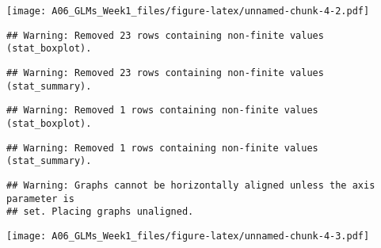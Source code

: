 \documentclass[]{article}
\newenvironment{Shaded}{\begin{snugshade}}{\end{snugshade}}
\newcommand{\CommentTok}[1]{\textcolor[rgb]{0.56,0.35,0.01}{\textit{#1}}}
\newcommand{\DataTypeTok}[1]{\textcolor[rgb]{0.13,0.29,0.53}{#1}}
\newcommand{\DecValTok}[1]{\textcolor[rgb]{0.00,0.00,0.81}{#1}}
\newcommand{\FloatTok}[1]{\textcolor[rgb]{0.00,0.00,0.81}{#1}}
\newcommand{\KeywordTok}[1]{\textcolor[rgb]{0.13,0.29,0.53}{\textbf{#1}}}
\newcommand{\NormalTok}[1]{#1}
\newcommand{\StringTok}[1]{\textcolor[rgb]{0.31,0.60,0.02}{#1}}
\begin{document}
\texttt{[image: A06\_GLMs\_Week1\_files/figure-latex/unnamed-chunk-4-2.pdf]}

\begin{Shaded}
\end{Shaded}

\begin{verbatim}
## Warning: Removed 23 rows containing non-finite values (stat_boxplot).
\end{verbatim}

\begin{verbatim}
## Warning: Removed 23 rows containing non-finite values (stat_summary).
\end{verbatim}

\begin{verbatim}
## Warning: Removed 1 rows containing non-finite values (stat_boxplot).
\end{verbatim}

\begin{verbatim}
## Warning: Removed 1 rows containing non-finite values (stat_summary).
\end{verbatim}

\begin{verbatim}
## Warning: Graphs cannot be horizontally aligned unless the axis parameter is
## set. Placing graphs unaligned.
\end{verbatim}

\texttt{[image: A06\_GLMs\_Week1\_files/figure-latex/unnamed-chunk-4-3.pdf]}
\end{document}
